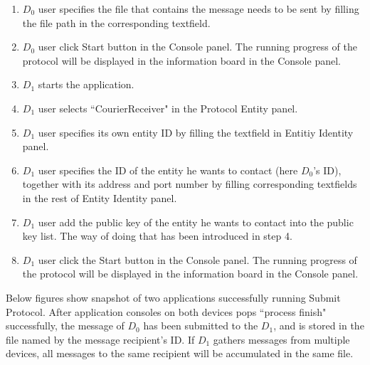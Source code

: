 \begin{enumerate}
\item $ D_0 $ user specifies the file that contains the message needs to be sent by filling the file path in the corresponding textfield.

\item $ D_0 $ user click Start button in the Console panel. The running progress of the protocol will be displayed in the information board in the Console panel.

\item $ D_1 $ starts the application.

\item $ D_1 $ user selects ``CourierReceiver" in the Protocol Entity panel.

\item $ D_1 $ user specifies its own entity ID by filling the textfield in Entitiy Identity panel.

\item $ D_1 $ user specifies the ID of the entity he wants to contact (here $ D_0 $'s ID), together with its address and port number by filling corresponding textfields in the rest of Entity Identity panel.

\item $ D_1 $ user add the public key of the entity he wants to contact into the public key list. The way of doing that has been introduced in step 4.

\item $ D_1 $ user click the Start button in the Console panel. The running progress of the protocol will be displayed in the information board in the Console panel.
\end{enumerate}
Below figures show snapshot of two applications successfully running Submit Protocol. After application consoles on both devices pops ``process finish" successfully, the message of $ D_0 $ has been submitted to the $ D_1 $, and is stored in the file named by the message recipient's ID. If $ D_1 $ gathers messages from multiple devices, all messages to the same recipient will be accumulated in the same file.

